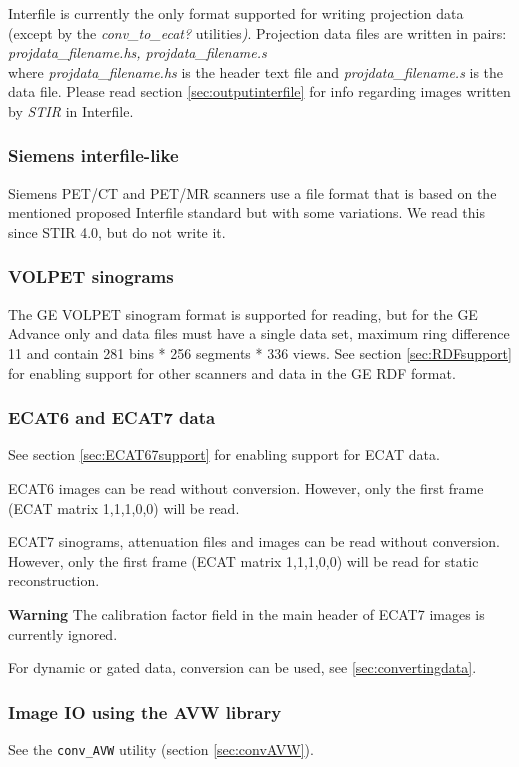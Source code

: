 \documentclass{article}
\begin{document}
Interfile is currently the only format supported for writing projection 
data (except by the \textit{conv\_to\_ecat?} utilities\textit{)}. Projection 
data files are written in pairs:\\
\textit{projdata\_filename.hs, 
projdata\_filename.s}\\
where \textit{projdata\_filename.hs} is the header text file and \textit{projdata\_filename.s} 
is the data file. Please read section \ref{sec:outputinterfile} for info regarding 
images written by \textit{STIR} in Interfile.

\subsubsection{Siemens interfile-like}
Siemens PET/CT and PET/MR scanners use a file format that is based on the mentioned
proposed Interfile standard but with some variations. We read this since STIR 4.0,
but do not write it.

\subsubsection{VOLPET sinograms}

The GE VOLPET sinogram format is supported for reading, but for
the GE Advance only and data files must have a single data set, maximum ring 
difference 11 and contain 281 bins * 256 segments * 336 views. 
See section \ref{sec:RDFsupport} for enabling support for other scanners and
data in the GE RDF format.

\subsubsection{ECAT6 and ECAT7 data} 
See section \ref{sec:ECAT67support} for enabling support for ECAT data.

ECAT6 images can be read without conversion. However, only the 
first frame (ECAT matrix 1,1,1,0,0) will be read.

ECAT7 sinograms, attenuation files and images can be read without 
conversion. However, only the first frame (ECAT matrix 1,1,1,0,0) 
will be read for static reconstruction.

\textbf{Warning} The calibration factor field in the main header of ECAT7 images
is currently ignored.

For dynamic or gated data, conversion can be used, see \ref{sec:convertingdata}.

\subsubsection{Image IO using the AVW library}
See the \texttt{conv\_AVW} utility (section \ref{sec:convAVW}).
\end{document}
